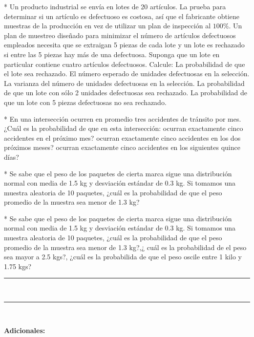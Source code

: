 \begin{Quest}*
Un producto industrial se envía en lotes de 20 artículos. La prueba para determinar si un artículo es defectuoso es costosa, así que el fabricante obtiene muestras de la producción en vez de utilizar un plan de inspección al $100\%$. Un plan de muestreo diseñado para minimizar el número de artículos defectuosos empleados necesita que se extraigan 5 piezas de cada lote y un lote es rechazado si entre las 5 piezas hay más de una defectuosa. Suponga que un lote en particular contiene cuatro artículos defectuosos. Calcule: La probabilidad de que el lote sea rechazado. El número esperado de unidades defectuosas en la selección. La varianza del número de unidades defectuosas en la selección. La probabilidad de que un lote con sólo 2 unidades defectuosas sea rechazado. La probabilidad de que un lote con 5 piezas defectuosas no sea rechazado.
\end{Quest}

\begin{Quest}*
En una intersección ocurren en promedio tres accidentes de tránsito por mes. ¿Cuál es la probabilidad de que en esta intersección: ocurran exactamente cinco accidentes en el próximo mes? ocurran exactamente cinco accidentes en los dos próximos meses? ocurran exactamente cinco accidentes en los siguientes quince días?
\end{Quest}


\begin{Quest}*
Se sabe que el peso de los paquetes de cierta marca sigue una distribución normal con media de 1.5 kg y desviación estándar de 0.3 kg. Si tomamos una muestra aleatoria de 10 paquetes, ¿cuál es la probabilidad de que el peso promedio de la muestra sea menor de 1.3 kg?
\end{Quest}

\begin{Quest}*
Se sabe que el peso de los paquetes de cierta marca sigue una distribución normal con media de 1.5 kg y desviación estándar de 0.3 kg. Si tomamos una muestra aleatoria de 10 paquetes, ¿cuál es la probabilidad de que el peso promedio de la muestra sea menor de 1.3 kg?,¿ cu\'al es la probabilidad de el peso sea mayor a 2.5 kgs?, ¿cu\'al es la probabilida de que el peso oscile entre 1 kilo y 1.75 kgs?
\end{Quest}
\begin{center}
\rule{15cm}{0.4pt} \\[0.2cm]
\rule{15cm}{0.4pt} \\[0.2cm]
\end{center}
\textbf{Adicionales:}

